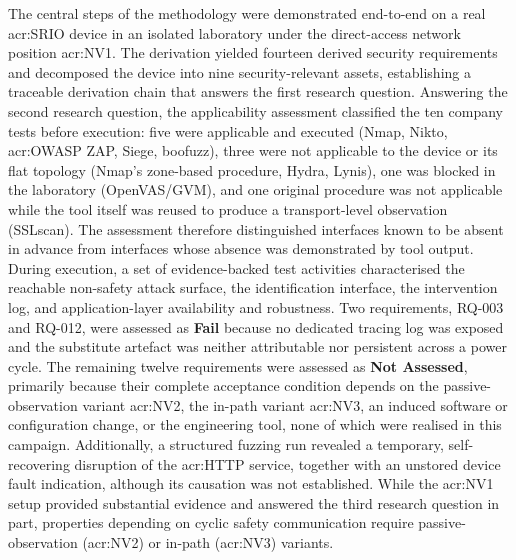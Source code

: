 The central steps of the methodology were demonstrated end-to-end on a real \acrfull{acr:SRIO} device in an isolated laboratory under the direct-access network position \gls{acr:NV1}. The derivation yielded fourteen derived security requirements and decomposed the device into nine security-relevant assets, establishing a traceable derivation chain that answers the first research question. Answering the second research question, the applicability assessment classified the ten company tests before execution: five were applicable and executed (Nmap, Nikto, \gls{acr:OWASP} ZAP, Siege, boofuzz), three were not applicable to the device or its flat topology (Nmap's zone-based procedure, Hydra, Lynis), one was blocked in the laboratory (OpenVAS/GVM), and one original procedure was not applicable while the tool itself was reused to produce a transport-level observation (SSLscan). The assessment therefore distinguished interfaces known to be absent in advance from interfaces whose absence was demonstrated by tool output. During execution, a set of evidence-backed test activities characterised the reachable non-safety attack surface, the identification interface, the intervention log, and application-layer availability and robustness. Two requirements, RQ-003 and RQ-012, were assessed as \textbf{Fail} because no dedicated tracing log was exposed and the substitute artefact was neither attributable nor persistent across a power cycle. The remaining twelve requirements were assessed as \textbf{Not Assessed}, primarily because their complete acceptance condition depends on the passive-observation variant \gls{acr:NV2}, the in-path variant \gls{acr:NV3}, an induced software or configuration change, or the engineering tool, none of which were realised in this campaign. Additionally, a structured fuzzing run revealed a temporary, self-recovering disruption of the \gls{acr:HTTP} service, together with an unstored device fault indication, although its causation was not established. While the \gls{acr:NV1} setup provided substantial evidence and answered the third research question in part, properties depending on cyclic safety communication require passive-observation (\gls{acr:NV2}) or in-path (\gls{acr:NV3}) variants.

